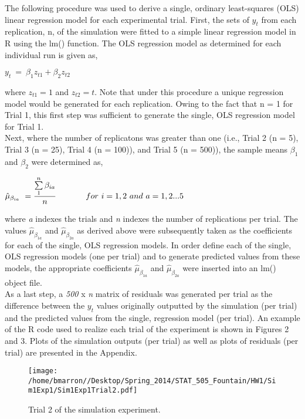 \documentclass[a4paper,11pt]{article}
\begin{document}
The following procedure was used to derive a single, ordinary least-squares (OLS) linear regression model for each experimental trial.  First, the sets of $ y_{t}$ from each replication, n, of the simulation were fitted to a simple linear regression model in R using the lm() function. The OLS regression model as determined for each individual run is given as, 
\begin{center}
$ y_{t} \ = \ \beta _{1}z_{t1} + \beta _{2}z_{t2}$
\end{center}
where $ z_{t1} = 1$ and $ z_{t2} = t$. Note that under this procedure a unique regression model would be generated for each replication. Owing to the fact that n = 1 for Trial 1, this first step was sufficient to generate the single, OLS regression model for Trial 1.\\

Next, where the number of replicatons was greater than one (i.e., Trial 2 (n = 5), Trial 3 (n = 25), Trial 4 (n = 100)), and Trial 5 (n = 500)), the sample means $ \beta _{1} $ and $  \beta _{2}$ were determined as,
\begin{center}
$ \hat{\mu }_{\beta_{ia}}\ = \dfrac{\sum\limits_{1}^{n}\beta _{ia}}{n} \hspace{.5 in}for \ i = 1,2 \ and \ a = 1,2 ... 5 $
\end{center}
where \textit{a} indexes the trials and \textit{n} indexes the number of replications per trial.   The values $ \hat{\mu}_{\beta _{1a}}$ and $\hat{\mu}_{\beta _{2a}} $ as derived above were subsequently taken as the coefficients for each of the single, OLS regression models. In order define each of the single, OLS regression models (one per trial) and to generate predicted values from these models, the appropriate coefficients $ \hat{\mu}_{\beta _{1a}}$ and $\hat{\mu}_{\beta _{2a}} $ were inserted into an lm() object file.\\

As a last step, a \textit{500} x \textit{n} matrix of residuals was generated per trial as the difference between the $ y_{t}$ values originally outputted by the simulation (per trial) and the predicted values from the single, regression model (per trial). An example of the R code used to realize each trial of the experiment is shown in Figures 2 and 3.  Plots of the simulation outputs (per trial) as well as plots of residuals (per trial) are presented in the Appendix.\\

\begin{figure}
\caption{Trial 2 of the simulation experiment.}
    \texttt{[image: /home/bmarron//Desktop/Spring\_2014/STAT\_505\_Fountain/HW1/Sim1Exp1/Sim1Exp1Trial2.pdf]}
\end{figure}
\end{document}
